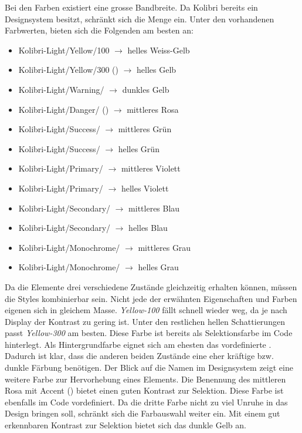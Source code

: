 Bei den Farben existiert eine grosse Bandbreite. 
Da Kolibri bereits ein Designsystem besitzt, schränkt sich die Menge ein. 
Unter den vorhandenen Farbwerten, bieten sich die Folgenden am besten an: 

\begin{itemize}
    \item Kolibri-Light/Yellow/100 $\rightarrow$ helles Weiss-Gelb
    \item Kolibri-Light/Yellow/300 () $\rightarrow$ helles Gelb
    \item Kolibri-Light/Warning/ $\rightarrow$ dunkles Gelb
    \item Kolibri-Light/Danger/ () $\rightarrow$ mittleres Rosa
    \item Kolibri-Light/Success/ $\rightarrow$ mittleres Grün
    \item Kolibri-Light/Success/ $\rightarrow$ helles Grün
    \item Kolibri-Light/Primary/ $\rightarrow$ mittleres Violett
    \item Kolibri-Light/Primary/ $\rightarrow$ helles Violett
    \item Kolibri-Light/Secondary/ $\rightarrow$ mittleres Blau
    \item Kolibri-Light/Secondary/ $\rightarrow$ helles Blau
    \item Kolibri-Light/Monochrome/ $\rightarrow$ mittleres Grau
    \item Kolibri-Light/Monochrome/ $\rightarrow$ helles Grau
\end{itemize}

Da die Elemente drei verschiedene Zustände gleichzeitig erhalten können, müssen die Styles kombinierbar sein. 
Nicht jede der erwähnten Eigenschaften und Farben eigenen sich in gleichem Masse. 
\emph{Yellow-100} fällt schnell wieder weg, da je nach Display der Kontrast zu gering ist. 
Unter den restlichen hellen Schattierungen passt \emph{Yellow-300} am besten. 
Diese Farbe ist bereits als Selektionsfarbe im Code hinterlegt. 
Als Hintergrundfarbe eignet sich am ehesten das vordefinierte . 
Dadurch ist klar, dass die anderen beiden Zustände eine eher kräftige bzw. dunkle Färbung benötigen. 
Der Blick auf die Namen im Designsystem zeigt eine weitere Farbe zur Hervorhebung eines Elements. 
Die Benennung des mittleren Rosa mit Accent () bietet einen guten Kontrast zur Selektion. 
Diese Farbe ist ebenfalls im Code vordefiniert. 
Da die dritte Farbe nicht zu viel Unruhe in das Design bringen soll, schränkt sich die Farbauswahl weiter ein. 
Mit einem gut erkennbaren Kontrast zur Selektion bietet sich das dunkle Gelb  an. 

